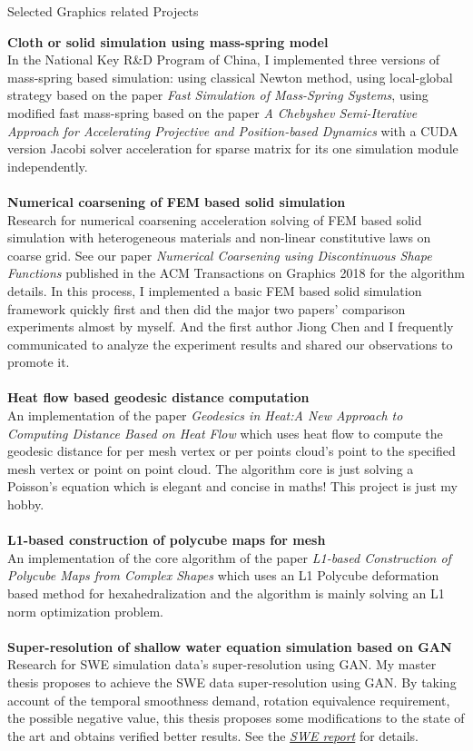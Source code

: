 \documentclass{resume} %
\begin{document}
\begin{rSection}{Selected Graphics related Projects}

  {\bf Cloth or solid simulation using mass-spring model}\\In the National Key R\&D Program of China, I implemented three versions of mass-spring based simulation: using classical Newton method, using local-global strategy based on the paper \textit{Fast Simulation of Mass-Spring Systems}, using modified fast mass-spring based on the paper \textit{A Chebyshev Semi-Iterative Approach for Accelerating Projective and Position-based Dynamics} with a CUDA version Jacobi solver acceleration for sparse matrix for its one simulation module independently.\\
  \\{\bf Numerical coarsening of FEM based solid simulation}\\ Research for numerical coarsening acceleration solving of FEM based solid simulation with heterogeneous materials and non-linear constitutive laws on coarse grid. See our paper \emph{Numerical Coarsening using Discontinuous Shape Functions} published in the ACM Transactions on Graphics 2018 for the algorithm details. In this process, I implemented a basic FEM based solid simulation framework quickly first and then did the major two papers' comparison experiments almost by myself. And the first author Jiong Chen and I frequently communicated to analyze the experiment results and shared our observations to promote it. \\
  \\{\bf Heat flow based geodesic distance computation}\\An implementation of the paper \emph{Geodesics in Heat:A New Approach to Computing Distance Based on Heat Flow} which uses heat flow to compute the geodesic distance for per mesh vertex or per points cloud's point to the specified mesh vertex or point on point cloud. The algorithm core is just solving a Poisson's equation which is elegant and concise in maths! This project is just my hobby.\\
  \\{\bf L1-based construction of polycube maps for mesh}\\An implementation of the core algorithm of the paper \emph{L1-based Construction of Polycube Maps from Complex Shapes} which uses an L1 Polycube deformation based method for hexahedralization and the algorithm is mainly solving an L1 norm optimization problem.\\
  \\{\bf Super-resolution of shallow water equation simulation based on GAN}\\ Research for SWE simulation data's super-resolution using GAN. My master thesis proposes to achieve the SWE data super-resolution using GAN. By taking account of the temporal smoothness demand, rotation equivalence requirement, the possible negative value, this thesis proposes some modifications to the state of the art and obtains verified better results. See the \emph{\href{https://wtyatzoo.github.io/reports/SWE.pdf}{SWE report}} for details. \\

\end{rSection}
\end{document}
